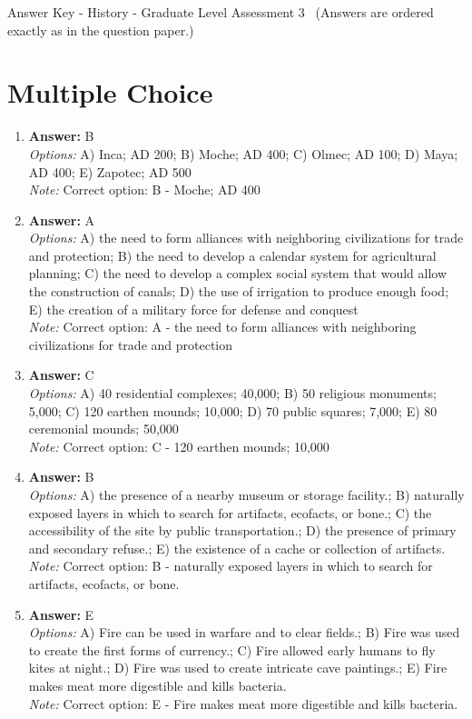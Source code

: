 \documentclass[12pt]{article}
\begin{document}
\begin{center}
Answer Key - History - Graduate Level Assessment 3 \
\small (Answers are ordered exactly as in the question paper.)
\end{center}

\section*{Multiple Choice}
\begin{enumerate}[label=\arabic*.]
\item \textbf{Answer:} B
\\ \textit{Options:} A) Inca; AD 200; B) Moche; AD 400; C) Olmec; AD 100; D) Maya; AD 400; E) Zapotec; AD 500
\\ \textit{Note:} Correct option: B - Moche; AD 400
\item \textbf{Answer:} A
\\ \textit{Options:} A) the need to form alliances with neighboring civilizations for trade and protection; B) the need to develop a calendar system for agricultural planning; C) the need to develop a complex social system that would allow the construction of canals; D) the use of irrigation to produce enough food; E) the creation of a military force for defense and conquest
\\ \textit{Note:} Correct option: A - the need to form alliances with neighboring civilizations for trade and protection
\item \textbf{Answer:} C
\\ \textit{Options:} A) 40 residential complexes; 40,000; B) 50 religious monuments; 5,000; C) 120 earthen mounds; 10,000; D) 70 public squares; 7,000; E) 80 ceremonial mounds; 50,000
\\ \textit{Note:} Correct option: C - 120 earthen mounds; 10,000
\item \textbf{Answer:} B
\\ \textit{Options:} A) the presence of a nearby museum or storage facility.; B) naturally exposed layers in which to search for artifacts, ecofacts, or bone.; C) the accessibility of the site by public transportation.; D) the presence of primary and secondary refuse.; E) the existence of a cache or collection of artifacts.
\\ \textit{Note:} Correct option: B - naturally exposed layers in which to search for artifacts, ecofacts, or bone.
\item \textbf{Answer:} E
\\ \textit{Options:} A) Fire can be used in warfare and to clear fields.; B) Fire was used to create the first forms of currency.; C) Fire allowed early humans to fly kites at night.; D) Fire was used to create intricate cave paintings.; E) Fire makes meat more digestible and kills bacteria.
\\ \textit{Note:} Correct option: E - Fire makes meat more digestible and kills bacteria.
\end{enumerate}
\end{document}
